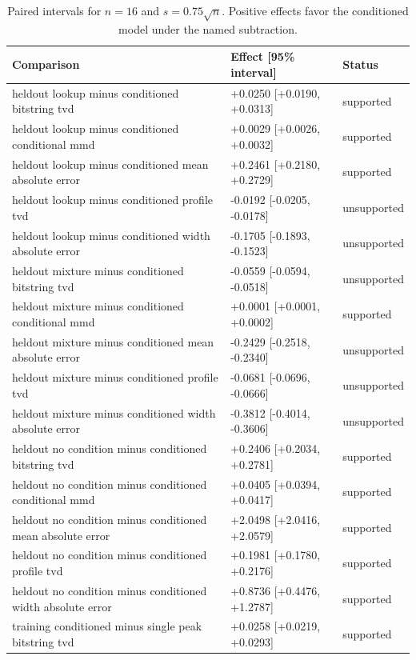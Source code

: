 \begin{table}[p]
\centering
\scriptsize
\setlength{\tabcolsep}{4pt}
\caption{Paired intervals for $n=16$ and $s=0.75\sqrt n$. Positive effects favor the conditioned model under the named subtraction.}
\label{tab:all-intervals-n16-w0.75}
\begin{tabular}{@{}p{}p{}p{}@{}}
\toprule
Comparison & Effect [95\% interval] & Status\\
\midrule
heldout lookup minus conditioned bitstring tvd & +0.0250 [+0.0190, +0.0313] & supported \\
heldout lookup minus conditioned conditional mmd & +0.0029 [+0.0026, +0.0032] & supported \\
heldout lookup minus conditioned mean absolute error & +0.2461 [+0.2180, +0.2729] & supported \\
heldout lookup minus conditioned profile tvd & -0.0192 [-0.0205, -0.0178] & unsupported \\
heldout lookup minus conditioned width absolute error & -0.1705 [-0.1893, -0.1523] & unsupported \\
heldout mixture minus conditioned bitstring tvd & -0.0559 [-0.0594, -0.0518] & unsupported \\
heldout mixture minus conditioned conditional mmd & +0.0001 [+0.0001, +0.0002] & supported \\
heldout mixture minus conditioned mean absolute error & -0.2429 [-0.2518, -0.2340] & unsupported \\
heldout mixture minus conditioned profile tvd & -0.0681 [-0.0696, -0.0666] & unsupported \\
heldout mixture minus conditioned width absolute error & -0.3812 [-0.4014, -0.3606] & unsupported \\
heldout no condition minus conditioned bitstring tvd & +0.2406 [+0.2034, +0.2781] & supported \\
heldout no condition minus conditioned conditional mmd & +0.0405 [+0.0394, +0.0417] & supported \\
heldout no condition minus conditioned mean absolute error & +2.0498 [+2.0416, +2.0579] & supported \\
heldout no condition minus conditioned profile tvd & +0.1981 [+0.1780, +0.2176] & supported \\
heldout no condition minus conditioned width absolute error & +0.8736 [+0.4476, +1.2787] & supported \\
training conditioned minus single peak bitstring tvd & +0.0258 [+0.0219, +0.0293] & supported \\

\end{tabular}
\end{table}
